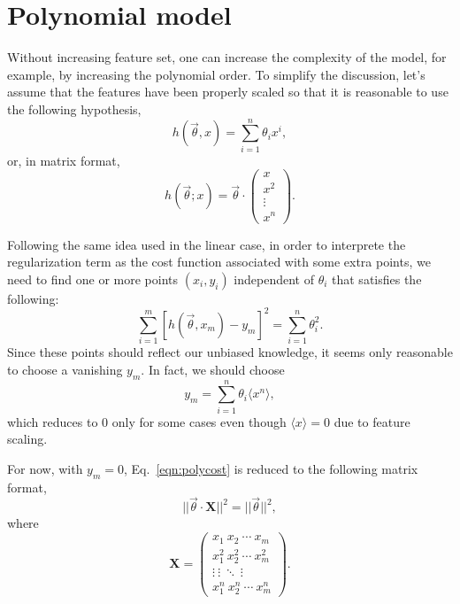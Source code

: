 \section{Polynomial model}
Without increasing feature set, one can increase the complexity of the model, for example, by increasing the polynomial order. To simplify the discussion, let's assume that the features have been properly scaled so that it is reasonable to use the following hypothesis,
\begin{equation}
h(\vec\theta, x) = \sum_{i=1}^n\theta_ix^i,
\end{equation}
or, in matrix format,
\begin{equation}
h(\vec\theta; x) =\vec\theta\cdot\begin{pmatrix}
x\\x^2\\\vdots\\x^n
\end{pmatrix}.
\end{equation}

Following the same idea used in the linear case, in order to interprete the regularization term as the cost function associated with some extra points, we need to find one or more points $(x_i, y_i)$ independent of $\theta_i$ that satisfies the following:
\begin{equation}
\sum_{i=1}^{m}\left[h(\vec\theta,x_m)-y_m\right]^2 = \sum_{i=1}^n\theta_i^2.
\label{eqn:polycost}
\end{equation}
Since these points should reflect our unbiased knowledge, it seems only reasonable to choose a vanishing $y_m$. In fact, we should choose
\begin{equation}
y_m = \sum_{i=1}^n\theta_i\langle x^n\rangle,
\end{equation}
which reduces to 0 only for some cases even though $\langle x\rangle=0$ due to feature scaling.

For now, with $y_m=0$, Eq.~\ref{eqn:polycost} is reduced to the following matrix format,
\begin{equation}
||\vec\theta\cdot\mathbf X||^2 = ||\vec\theta||^2,\label{eqn:rotation}
\end{equation} 
where
\begin{equation}
\mathbf X = \begin{pmatrix}
x_1\ x_2\ \cdots\ x_m\\
x_1^2\ x_2^2\ \cdots\ x_m^2\\
\vdots\ \vdots\ \ddots\ \vdots\\
x_1^n\ x_2^n\ \cdots\ x_m^n
\end{pmatrix}.
\end{equation}


